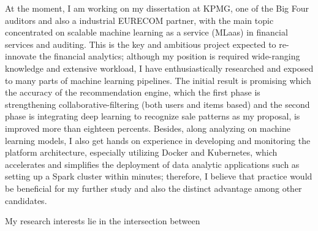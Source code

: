 \documentclass[10pt,a4paper,roman]{moderncv}        %
\begin{document}
At the moment, I am working on my dissertation at KPMG, one of the Big Four auditors and also a industrial EURECOM partner, with the main topic concentrated on scalable machine learning as a service (MLaas) in financial services and auditing. This is the key and ambitious project expected to re-innovate the financial analytics; although my position is required wide-ranging knowledge and extensive workload, I have enthusiastically researched and exposed to many parts of machine learning pipelines. The initial result is promising which the accuracy of the recommendation engine, which the first phase is strengthening collaborative-filtering (both users and items based) and the second phase is integrating deep learning to recognize sale patterns as my proposal, is improved more than eighteen percents. Besides, along analyzing on machine learning models, I also get hands on experience in developing and monitoring the platform architecture, especially utilizing Docker and Kubernetes, which accelerates and simplifies the deployment of data analytic applications such as setting up a Spark cluster within minutes; therefore, I believe that practice would be beneficial for my further study and also the distinct advantage among other candidates.

My research interests lie in the intersection between  	





\vspace{0.5cm}


\makeletterclosing
\end{document}
